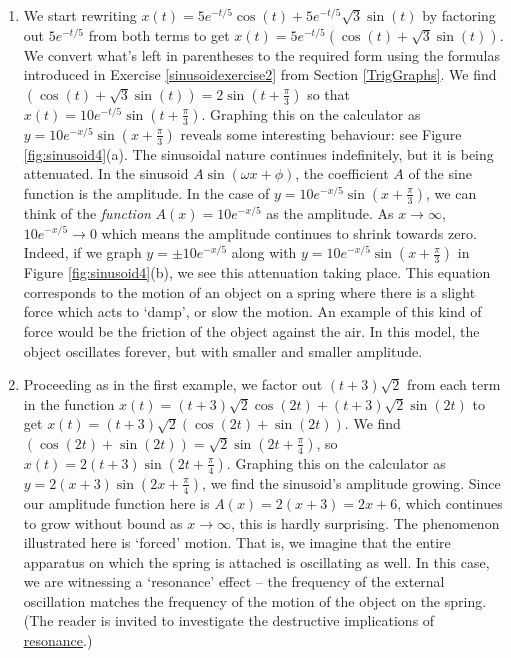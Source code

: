{
\begin{enumerate}

\item  We start rewriting  $x(t) = 5e^{-t/5} \cos(t) + 5e^{-t/5} \sqrt{3} \sin(t)$ by factoring out   $5e^{-t/5}$ from both terms to get  $x(t) = 5e^{-t/5} \left( \cos(t) + \sqrt{3} \sin(t)\right)$. We convert what's left in parentheses to the required form using the formulas introduced in Exercise  \ref{sinusoidexercise2} from Section \ref{TrigGraphs}.  We find $\left( \cos(t) + \sqrt{3} \sin(t)\right) = 2\sin\left(t+\frac{\pi}{3}\right)$ so that $x(t) = 10e^{-t/5} \sin\left(t + \frac{\pi}{3}\right)$.  Graphing this on the calculator as $y = 10e^{-x/5} \sin\left(x + \frac{\pi}{3}\right)$ reveals some interesting behaviour: see Figure \ref{fig:sinusoid4}(a).  The sinusoidal nature continues indefinitely, but it is being attenuated.  In the sinusoid $A \sin(\omega x + \phi)$, the coefficient $A$ of the sine function is the amplitude.  In the case of $y = 10e^{-x/5} \sin\left(x + \frac{\pi}{3}\right)$, we can think of the \textit{function} $A(x) = 10e^{-x/5}$ as the amplitude.  As $x \rightarrow \infty$, $10e^{-x/5} \rightarrow 0$ which means the amplitude continues to shrink towards zero.  Indeed, if we graph $y = \pm 10e^{-x/5}$ along with $y = 10e^{-x/5} \sin\left(x + \frac{\pi}{3}\right)$ in Figure \ref{fig:sinusoid4}(b), we see this attenuation taking place.  This equation corresponds to the motion of an object on a spring where there is a slight force which acts to `damp', or slow the motion.  An example of this kind of force would be the friction of the object against the air. In this model, the object oscillates forever, but with smaller and smaller amplitude. 



\item  Proceeding as in the first example, we factor out $(t+3)\sqrt{2}$ from each term in the function $x(t) = (t+3)\sqrt{2} \cos(2t) + (t+3) \sqrt{2} \sin(2t)$ to get $x(t) = (t+3)\sqrt{2}(\cos(2t) + \sin(2t))$.   We find $(\cos(2t) + \sin(2t)) = \sqrt{2} \sin\left(2t + \frac{\pi}{4}\right)$, so $x(t) = 2(t+3) \sin\left(2t + \frac{\pi}{4}\right)$.  Graphing this on the calculator as $y = 2(x+3) \sin\left(2x + \frac{\pi}{4}\right)$, we find the sinusoid's amplitude growing.  Since our amplitude function here is $A(x) = 2(x+3) = 2x+6$, which continues to grow without bound as $x \rightarrow \infty$, this is hardly surprising.  The phenomenon illustrated here is `forced' motion.  That is, we imagine that the entire apparatus on which the spring is attached is oscillating as well.  In this case, we are witnessing a `resonance' effect -- the frequency of the external oscillation matches the frequency of the motion of the object on the spring. (The reader is invited to investigate the destructive implications of \href{http://en.wikipedia.org/wiki/Resonance}{\underline{resonance}}.)


\end{enumerate}}

